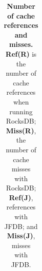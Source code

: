 \begin{table}
\begin{tabular}{| l | r | r | r | r | }
    \end{tabular}
    \vspace{5pt}
    \caption{\textbf{Number of cache references and misses.}
        \textbf{Ref(R)} is the number of cache references when running RocksDB; 
        \textbf{Miss(R)}, the number of cache misses with RocksDB; 
        \textbf{Ref(J)}, references with JFDB; and \textbf{Miss(J)}, misses with JFDB.
    }    
    \label{tab_cache_miss}
\end{table}
 

